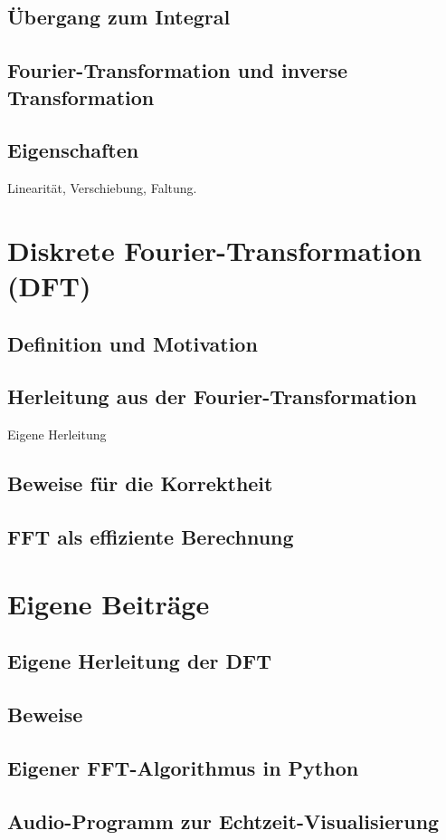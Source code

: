 \documentclass[a4paper,12pt]{article}
\theoremstyle{definition}
\theoremstyle{remark}
\begin{document}
\subsection{Übergang zum Integral}
\subsection{Fourier-Transformation und inverse Transformation}
\subsection{Eigenschaften}
Linearität, Verschiebung, Faltung.

\section{Diskrete Fourier-Transformation (DFT)}
\subsection{Definition und Motivation}
\subsection{Herleitung aus der Fourier-Transformation}
Eigene Herleitung
\subsection{Beweise für die Korrektheit}
\subsection{FFT als effiziente Berechnung}

\section{Eigene Beiträge}
\subsection{Eigene Herleitung der DFT}
\subsection{Beweise}
\subsection{Eigener FFT-Algorithmus in Python}
\subsection{Audio-Programm zur Echtzeit-Visualisierung}
\end{document}

